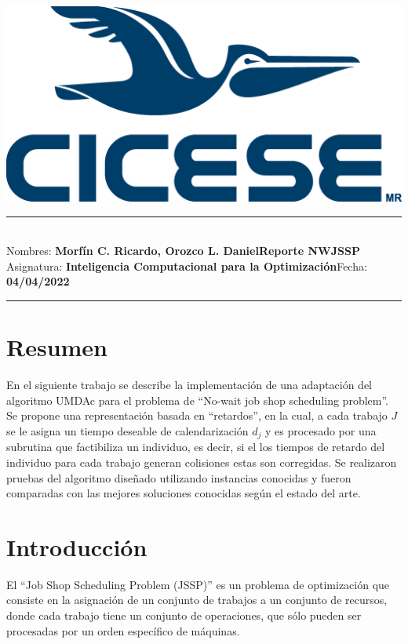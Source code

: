 \documentclass[12pt,a4paper]{article}
\newcommand{\student}{\textbf{Morfín C. Ricardo, Orozco L. Daniel}}
\newcommand{\course}{\textbf{Inteligencia Computacional para la Optimización}}
\newcommand{\assignment}{\textbf{Reporte NWJSSP}}
\begin{document}
\thispagestyle{empty}
\begin{center}
	\includegraphics[scale = 0.25]{Figure/cicese.png}
	\vspace{0.1cm}
\end{center}
\noindent
\rule{17cm}{0.2cm}\\[0.3cm]
Nombres: \student \hfill \assignment\\[0.1cm]
Asignatura: \course \hfill Fecha: \textbf{04/04/2022}\\
\rule{17cm}{0.05cm}
\vspace{0.1cm}



\section{Resumen}

    En el siguiente trabajo se describe la implementación de una adaptación del algoritmo UMDAc para el problema de ``No-wait job shop scheduling problem''. Se propone una representación basada en ``retardos'', en la cual, a cada trabajo $J$ se le asigna un tiempo deseable de calendarización $d_j$ y es procesado por una subrutina que factibiliza un individuo, es decir, si el los tiempos de retardo del individuo para cada trabajo generan colisiones estas son corregidas. Se realizaron pruebas del algoritmo diseñado utilizando instancias conocidas y fueron comparadas con las mejores soluciones conocidas según el estado del arte.

\section{Introducción}
    El ``Job Shop Scheduling Problem (JSSP)'' es un problema de optimización que consiste en la asignación de un conjunto de trabajos a un conjunto de recursos, donde cada trabajo tiene un conjunto de operaciones, que sólo pueden ser procesadas por un orden específico de máquinas. \cite{gonzalez_2011} 
    
\end{document}
